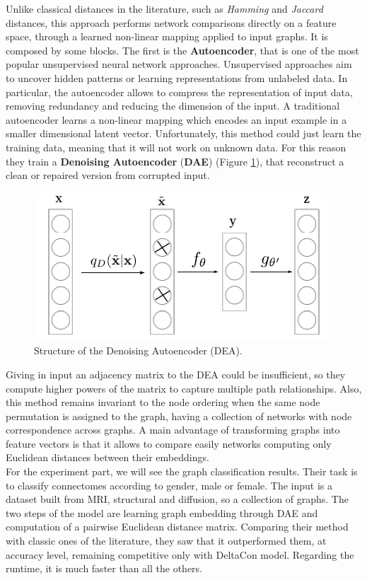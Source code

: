 Unlike classical distances in the literature, such as \textit{Hamming} and \textit{Jaccard} distances, this approach performs network comparisons directly on a feature space, through a learned non-linear mapping applied to input graphs. It is composed by some blocks. The first is the \textbf{Autoencoder}, that is one of the most popular unsupervised neural network approaches. Unsupervised approaches aim to uncover hidden patterns or learning representations from unlabeled data. In particular, the autoencoder allows to compress the representation of input data, removing redundancy and reducing the dimension of the input. A traditional autoencoder learns a non-linear mapping which encodes an input example in a smaller dimensional latent vector. Unfortunately, this method could just learn the training data, meaning that it will not work on unknown data. For this reason they train a \textbf{Denoising Autoencoder} (\textbf{DAE}) (Figure \ref{fig:diagram12}), that reconstruct a clean or repaired version from corrupted input.

\begin{figure}[htbp]
	\centering
	\includegraphics[scale=0.5]{Immagini/unsupervised2.PNG}
	\caption{Structure of the Denoising Autoencoder (DEA).}
	\label{fig:diagram12}
\end{figure}
 
Giving in input an adjacency matrix to the DEA could be insufficient, so they compute higher powers of the matrix to capture multiple path relationships. Also, this method remains invariant to the node ordering when the same node permutation is assigned to the graph, having a collection of networks with node correspondence across graphs. A main advantage of transforming graphs into feature vectors is that it allows to compare easily networks computing only Euclidean distances between their
embeddings.
\\

For the experiment part, we will see the graph classification results. Their task is to classify connectomes according to gender, male or female. The input is a dataset built from MRI, structural and diffusion, so a collection of graphs. The two steps of the model are learning graph embedding through DAE and computation of a pairwise Euclidean distance matrix. Comparing their method with classic ones of the literature, they saw that it outperformed them, at accuracy level, remaining competitive only with DeltaCon model. Regarding the runtime, it is much faster than all the others.
